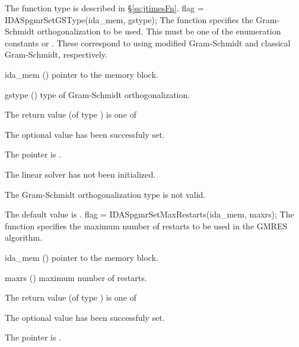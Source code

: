 {{  The function type  is described in \S\ref{ss:jtimesFn}.
}
{
  flag = IDASpgmrSetGSType(ida\_mem, gstype);
}
{
  The function  specifies the 
  Gram-Schmidt orthogonalization to be used. 
  This must be one of the enumeration constants 
  or . These correspond to using modified Gram-Schmidt 
  and classical Gram-Schmidt, respectively. 
}
{
  \begin{args}
  \item[ida\_mem] ()
    pointer to the {\ida} memory block.
  \item[gstype] ()
    type of Gram-Schmidt orthogonalization.
  \end{args}
}
{
  The return value  (of type ) is one of
  \begin{args}
  \item[\Id{IDASPGMR\_SUCCESS}] 
    The optional value has been successfuly set.
  \item[\Id{IDASPGMR\_MEM\_NULL}]
    The  pointer is .
  \item[\Id{IDASPGMR\_LMEM\_NULL}]
    The {\idaspgmr} linear solver has not been initialized.
  \item[\Id{IDASPGMR\_ILL\_INPUT}]
    The Gram-Schmidt orthogonalization type  is not valid.
  \end{args}
}
{
  The default value is .
}
{
  flag = IDASpgmrSetMaxRestarts(ida\_mem, maxrs);
}
{
  The function  specifies the maximum number of 
  restarts to be used in the GMRES algorithm.
}
{
  \begin{args}
  \item[ida\_mem] ()
    pointer to the {\ida} memory block.
  \item[maxrs] ()
    maximum number of restarts.
  \end{args}
}
{
  The return value  (of type ) is one of
  \begin{args}
  \item[\Id{IDASPGMR\_SUCCESS}] 
    The optional value has been successfuly set.
  \item[\Id{IDASPGMR\_MEM\_NULL}]
    The  pointer is .
  \item[\Id{IDASPGMR\_LMEM\_NULL}]

\end{args}}}
